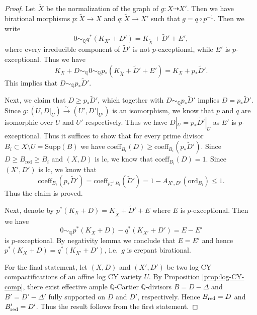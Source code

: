 \documentclass[reqno, 12pt]{amsart}
\theoremstyle{definition}
\newcommand{\bQ}{\mathbb{Q}}
\newcommand{\tX}{\widetilde{X}}
\newcommand{\tD}{\widetilde{D}}
\newcommand{\Supp}{\mathrm{Supp}}
\newcommand{\ord}{\mathrm{ord}}
\newcommand{\coeff}{\mathrm{coeff}}
\newcommand{\red}{\mathrm{red}}
\numberwithin{equation}{section}
\begin{document}
\begin{proof}
Let $\tX$ be the normalization of the graph of $g:X\dashrightarrow X'$. Then we have birational morphisms $p: \tX \to X$ and $q: \tX \to X'$ such that $g = q\circ p^{-1}$. Then we write
\[
0 \sim_{\bQ} q^*(K_{X'} + D') = K_{\tX} + \tD' + E',
\]
where every irreducible component of $\tD'$ is not $p$-exceptional, while $E'$ is $p$-exceptional. Thus we have 
\[
K_X + D\sim_{\bQ} 0\sim_{\bQ} p_*(K_{\tX} + \tD' + E') = K_X + p_* \tD' .
\]
This implies that $D \sim_{\bQ} p_* \tD'$.

Next, we claim that $D \geq p_* \tD'$, which together with $D \sim_{\bQ} p_* \tD'$ implies $D =  p_* \tD'$. Since $g: (U, D|_U)\xrightarrow{\sim} (U', D'|_{U'})$ is an isomorphism, we know that $p$ and $q$ are isomorphic over $U$ and $U'$ respectively. 
Thus we have $D|_U = p_* \tD'|_{U}$ as $E'$ is $p$-exceptional. Thus it suffices to show that for every prime divisor $B_i\subset X\setminus U = \Supp(B)$ we have $\coeff_{B_i}(D) \geq \coeff_{B_i}(p_* \tD')$. Since $D\geq B_{\red}\geq B_i$ and $(X,D)$ is lc, we know that $\coeff_{B_i}(D) = 1$. Since $(X',D')$ is lc, we know that 
\[
\coeff_{B_i}(p_*\tD') = \coeff_{p_*^{-1}B_i} (\tD') =   1 - A_{X', D'}(\ord_{B_i}) \leq 1.
\]
Thus the claim is proved. 

Next, denote by $p^*(K_X+ D) = K_{\tX} + \tD' + E$ where $E$ is $p$-exceptional. Then we have 
\[
0\sim_{\bQ} p^*(K_X + D) - q^*(K_{X'} + D')  = E - E'
\]
is $p$-exceptional. By negativity lemma we conclude that $E= E'$ and hence $p^*(K_X+D) = q^*(K_{X'}+D')$, i.e.\ $g$ is crepant birational.

For the final statement, let \((X,D)\) and \((X',D')\) be two log CY compactifications of an affine log CY variety \(U\). By Proposition \ref{prop:log-CY-comp}, there exist effective ample $\bQ$-Cartier $\bQ$-divisors \(B=D-\Delta\) and \(B'=D'-\Delta'\) fully supported on \(D\) and \(D'\), respectively. Hence $ B_{\rm red}=D$ and $B'_{\rm red}=D'$.
Thus the result follows from the first statement.
\end{proof}
\end{document}
